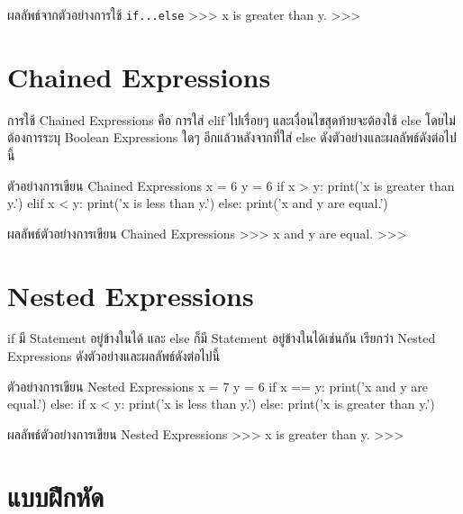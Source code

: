\begin{codelist}{ผลลัพธ์จากตัวอย่างการใช้ \texttt{if...else}}{}
>>>
x is greater than y.
>>>
\end{codelist}


\section{Chained Expressions}

การใช้ Chained Expressions คือ การใส่ elif ไปเรื่อยๆ และเงื่อนไขสุดท้ายจะต้องใช้ else โดยไม่ต้องการระบุ Boolean Expressions ใดๆ อีกแล้วหลังจากที่ใส่ else ดังตัวอย่างและผลลัพธ์ดังต่อไปนี้

\begin{codelist}{ตัวอย่างการเขียน Chained Expressions}{}
x = 6
y = 6
if x > y: print('x is greater than y.')
elif x < y: print('x is less than y.')
else: print('x and y are equal.')
\end{codelist}


\begin{codelist}{ผลลัพธ์ตัวอย่างการเขียน Chained Expressions}{}
>>>
x and y are equal.
>>>
\end{codelist}


\section{Nested Expressions}

if มี Statement อยู่ข้างในได้ และ else ก็มี Statement อยู่ข้างในได้เช่นกัน เรียกว่า Nested Expressions ดังตัวอย่างและผลลัพธ์ดังต่อไปนี้

\begin{codelist}{ตัวอย่างการเขียน Nested Expressions}{}
x = 7
y = 6
if x == y: print('x and y are equal.')
else:
    if x < y: print('x is less than y.')
    else: print('x is greater than y.')
\end{codelist}

\begin{codelist}{ผลลัพธ์ตัวอย่างการเขียน Nested Expressions}{}
>>>
x is greater than y.
>>>
\end{codelist}

\section{แบบฝึกหัด}

